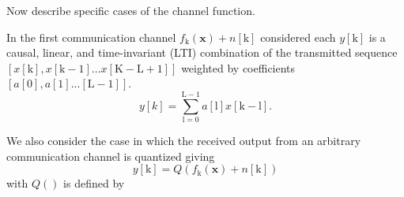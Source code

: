 \documentclass[12pt,a4paper]{report}
\begin{document}
Now describe specific cases of the channel function. 

In the first communication channel $f_{\text{k}}(\mathbf{x}) + n[\text{k}]$ considered each $y[\text{k}]$ is a causal, linear, and time-invariant (LTI) combination of the transmitted sequence $[x[\text{k}], x[\text{k}-1]... x[\text{K}-\text{L}+1]]$ weighted by coefficients $[a[0], a[1].. . [\text{L}-1]]$. 
\begin{equation*}
y[k] = \sum_{\mathrm{\text{l}=0}}^{\mathrm{\text{L}-1}} a[\text{l}]x[\text{k}-\text{l}].
\end{equation*}

\par 
We also consider the case in which the received output from an arbitrary communication channel is quantized giving
\begin{equation*}
y[\text{k}] = Q(f_{\text{k}}(\mathbf{x}) + n[\text{k}])
\end{equation*}
 with $Q()$ is defined by 
\end{document}

